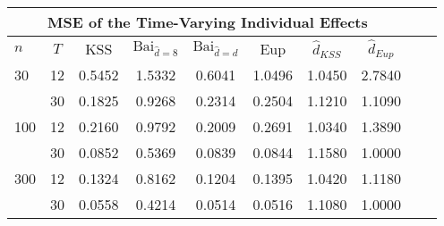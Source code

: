 \begin{tabular}{lccccccccc} 
\hline \multicolumn{8}{c}{MSE of the Time-Varying Individual Effects} \\ \hline 
$n$ & $T$ & KSS & $ \text{Bai}_{\hat{d} = 8}$ & $\text{Bai}_{\hat{d} = d}$ & Eup & $\hat{d}_{KSS}$ & $\hat{d}_{Eup}$ \\
\hline
30 & 12 &  0.5452  &  1.5332  &  0.6041  &  1.0496  &  1.0450  &  2.7840  \\
& 30 &  0.1825  &  0.9268  &  0.2314  &  0.2504  &  1.1210  &  1.1090  \\
100 & 12 &  0.2160  &  0.9792  &  0.2009  &  0.2691  &  1.0340  &  1.3890  \\
& 30 &  0.0852  &  0.5369  &  0.0839  &  0.0844  &  1.1580  &  1.0000  \\
300 & 12 &  0.1324  &  0.8162  &  0.1204  &  0.1395  &  1.0420  &  1.1180  \\
& 30 &  0.0558  &  0.4214  &  0.0514  &  0.0516  &  1.1080  &  1.0000  \\
\end{tabular} 

